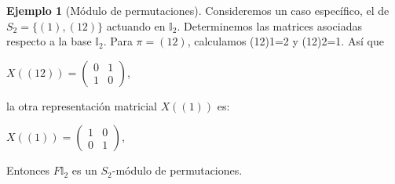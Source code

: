 \documentclass[12pt]{book}
\theoremstyle{definition}
\newtheorem{example}[theorem]{Ejemplo}
\newcounter{in}
\begin{document}
\begin{example}[Módulo de permutaciones]
  Consideremos un caso específico, el de $S_{2}=\{(1),(12)\}$ actuando en
  $\mathbb{I}_{2}$. Determinemos las
  matrices asociadas respecto a la base $\mathbb{I}_{2}$. Para
  $\pi=(12)$, calculamos (12)1=2 y (12)2=1. Así que
  \begin{center}
    $X((12))=\begin{pmatrix}
      0 & 1  \\
      1 & 0  
    \end{pmatrix}$,
  \end{center}
  la otra representación matricial $X((1))$ es:
  \begin{center}
    $X((1))=\begin{pmatrix}
      1 & 0  \\
      0 & 1  
    \end{pmatrix}$,
  \end{center}
Entonces $F\mathbb{I}_{2}$ es un $S_{2}$-módulo de permutaciones.

  

\end{example}
\end{document}
